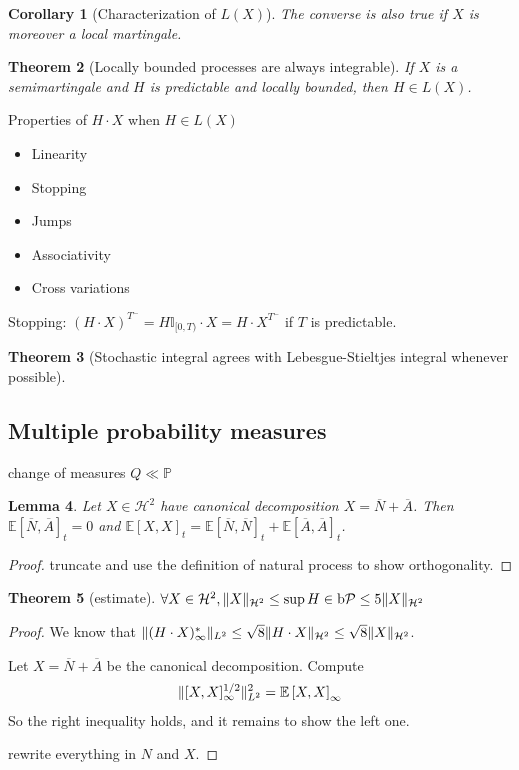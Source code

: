 \documentclass[openany,oneside]{book}
\newtheorem{thm}{Theorem}[section]
\newtheorem{lem}[thm]{Lemma}
\newtheorem{cor}[thm]{Corollary}
\theoremstyle{definition}
\theoremstyle{remark}
\newcommand{\E}{\mathbb{E}} %
\renewcommand{\P}{\mathbb{P}} %
\newcommand{\I}{\mathbb{I}} %
\DeclarePairedDelimiter{\norm}{\lVert}{\rVert} %
\newcommand{\sH}[1][2]{\mathcal{H}^{#1}} %
\newcommand{\pred}{\mathcal{P}} %
\newcommand{\bP}{\mathrm{b}\pred} %
\begin{document}
\begin{cor}[Characterization of $L(X)$]
The converse is also true if $X$ is moreover a local martingale.
\end{cor}

\begin{thm}[Locally bounded processes are always integrable]
If $X$ is a semimartingale and $H$ is predictable and locally bounded, then $H\in L(X)$.
\end{thm}

Properties of $H\cdot X$ when $H\in L(X)$
\begin{itemize}
\item Linearity
\item Stopping
\item Jumps
\item Associativity
\item Cross variations
\end{itemize}

Stopping: $(H\cdot X)^{T^-} = H\I_{[0,T)}\cdot X = H\cdot X^{T^-}$ if $T$ is predictable.

\par
\begin{thm}[Stochastic integral agrees with Lebesgue-Stieltjes integral whenever possible]
\end{thm}

\subsection{Multiple probability measures}
change of measures $Q \ll \P$

\begin{lem}
Let $X\in \sH$ have canonical decomposition $X=\overline{N}+\overline{A}$. Then $\E\left[\overline{N},\overline{A}\right]_t = 0$ and $\E\left[X,X\right]_t = \E\left[\overline{N},\overline{N}\right]_t + \E\left[\overline{A},\overline{A}\right]_t$.
\end{lem}
\begin{proof}
truncate and use the definition of natural process to show orthogonality.
\end{proof}

\begin{thm}[estimate]
$\forall X\in \sH, \norm{X}_{\sH} \le \sup{H\in\bP} \le 5\norm{X}_{\sH}$
\end{thm}
\begin{proof}
We know that $\norm{(H\cdot X)^\ast_\infty}_{L^2} \le \sqrt{8} \norm{H\cdot X}_{\sH} \le \sqrt{8}\norm{X}_{\sH}$.
\par
Let $X=\overline{N}+\overline{A}$ be the canonical decomposition. Compute
\begin{align*}
\norm{[X,X]^{1/2}_\infty}^2_{L^2} &= \E\left[X,X\right]_\infty \\
\end{align*}
So the right inequality holds, and it remains to show the left one.
\par
rewrite everything in $N$ and $X$.
\end{proof}
\end{document}
